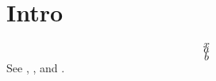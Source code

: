 \section{Intro}
\begin{equation}\label{eq:lead}x\end{equation}
\begin{equation}\label{eq:first}a\end{equation}
\begin{equation}\label{eq:second}b\end{equation}
See , , and .
